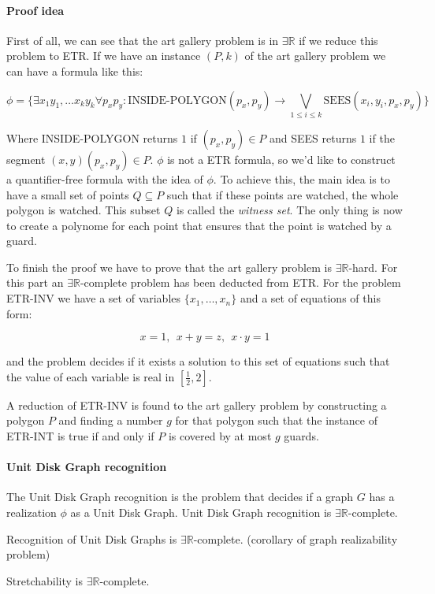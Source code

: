 \paragraph{Proof idea} First of all, we can see that the art gallery problem
is in $\exists \mathbb{R}$ if we reduce this problem to ETR. If we have an
instance $(P,k)$ of the art gallery problem we can have a formula
\cite{EFRAT2006238} like this:

$$\phi = \{\exists x_1y_1,\dots x_ky_k \forall p_xp_y :
\text{INSIDE-POLYGON}(p_x,p_y) \to \bigvee_{1 \leq i \leq k}
\text{SEES}(x_i,y_i,p_x,p_y)\}$$

Where INSIDE-POLYGON returns $1$ if $(p_x,p_y) \in P$ and SEES returns $1$ if
the segment $(x,y)(p_x,p_y) \in P$. $\phi$ is not a ETR formula, so we'd like
to construct a quantifier-free formula with the idea of $\phi$. To achieve this,
the main idea is to have a small set of points $Q \subseteq P$ such that if these
points are watched, the whole polygon is watched. This subset $Q$ is called
the \textit{witness set}. The only thing is now to create a polynome for each
point that ensures that the point is watched by a guard.

To finish the proof we have to prove that the art gallery problem is $\exists
\mathbb{R}$-hard. For this part an $\exists \mathbb{R}$-complete
problem has been deducted from ETR. For the problem ETR-INV we have a set of
variables $\{x_1,\dots,x_n\}$ and a set of equations of this form:

$$x = 1,\ \ x + y = z,\ \ x \cdot y = 1 $$

and the problem decides if it exists a solution to this set of equations such
that the value of each variable is real in $[\frac{1}{2},2]$.

A reduction of ETR-INV is found to the art gallery problem by constructing
a polygon $P$ and finding a number $g$ for that polygon such that the instance
of ETR-INT is true if and only if $P$ is covered by at most $g$ guards.

\paragraph{Unit Disk Graph recognition} The Unit Disk Graph recognition is
the problem that decides if a graph $G$ has a realization $\phi$ as a Unit
Disk Graph. Unit Disk Graph recognition is $\exists \mathbb{R}$-complete.

Recognition of Unit Disk Graphs is $\exists \mathbb{R}$-complete. (corollary of graph realizability problem)\cite{Schaefer2013}

Stretchability is $\exists \mathbb{R}$-complete.
